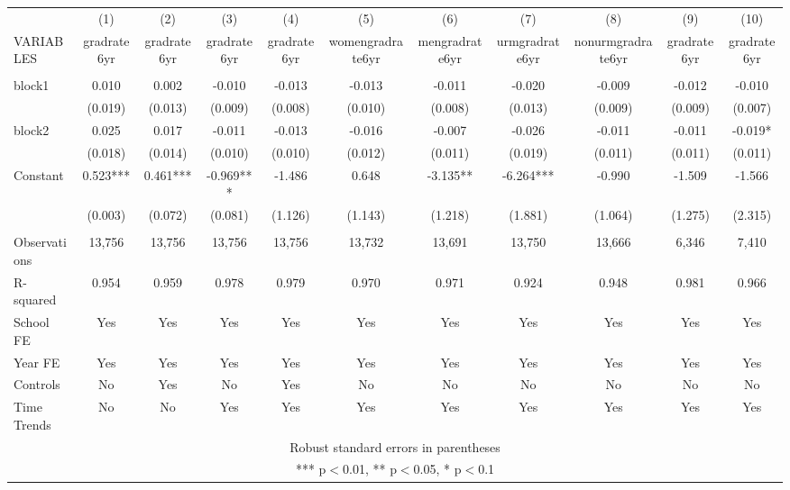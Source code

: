 \documentclass[]{article}
\begin{document}
\begin{tabular}{lcccccccccc} \hline
 & (1) & (2) & (3) & (4) & (5) & (6) & (7) & (8) & (9) & (10) \\
VARIABLES & gradrate6yr & gradrate6yr & gradrate6yr & gradrate6yr & womengradrate6yr & mengradrate6yr & urmgradrate6yr & nonurmgradrate6yr & gradrate6yr & gradrate6yr \\ \hline
 &  &  &  &  &  &  &  &  &  &  \\
block1 & 0.010 & 0.002 & -0.010 & -0.013 & -0.013 & -0.011 & -0.020 & -0.009 & -0.012 & -0.010 \\
 & (0.019) & (0.013) & (0.009) & (0.008) & (0.010) & (0.008) & (0.013) & (0.009) & (0.009) & (0.007) \\
block2 & 0.025 & 0.017 & -0.011 & -0.013 & -0.016 & -0.007 & -0.026 & -0.011 & -0.011 & -0.019* \\
 & (0.018) & (0.014) & (0.010) & (0.010) & (0.012) & (0.011) & (0.019) & (0.011) & (0.011) & (0.011) \\
Constant & 0.523*** & 0.461*** & -0.969*** & -1.486 & 0.648 & -3.135** & -6.264*** & -0.990 & -1.509 & -1.566 \\
 & (0.003) & (0.072) & (0.081) & (1.126) & (1.143) & (1.218) & (1.881) & (1.064) & (1.275) & (2.315) \\
 &  &  &  &  &  &  &  &  &  &  \\
Observations & 13,756 & 13,756 & 13,756 & 13,756 & 13,732 & 13,691 & 13,750 & 13,666 & 6,346 & 7,410 \\
R-squared & 0.954 & 0.959 & 0.978 & 0.979 & 0.970 & 0.971 & 0.924 & 0.948 & 0.981 & 0.966 \\
School FE & Yes & Yes & Yes & Yes & Yes & Yes & Yes & Yes & Yes & Yes \\
Year FE & Yes & Yes & Yes & Yes & Yes & Yes & Yes & Yes & Yes & Yes \\
Controls & No & Yes & No & Yes & No & No & No & No & No & No \\
 Time Trends & No & No & Yes & Yes & Yes & Yes & Yes & Yes & Yes & Yes \\ \hline
\multicolumn{11}{c}{ Robust standard errors in parentheses} \\
\multicolumn{11}{c}{ *** p$<$0.01, ** p$<$0.05, * p$<$0.1} \\
\end{tabular}
\end{document}
